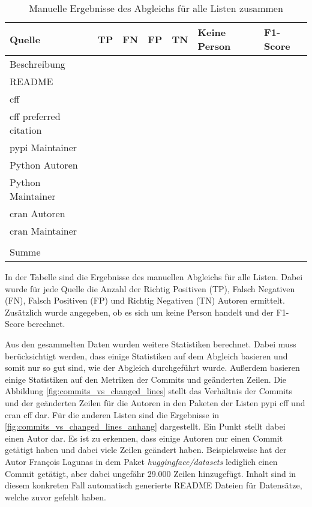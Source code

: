 \begin{table}
    \centering
    \begin{tabularx}{\textwidth}{XR{.5cm}R{.5cm}R{.5cm}R{.5cm}R{2.8cm}R{2cm}}
        \toprule
        \textbf{Quelle} & \textbf{TP} & \textbf{FN} & \textbf{FP} & \textbf{TN} & \textbf{Keine Person} & \textbf{F1-Score} \\ \midrule
        Beschreibung                 & & & & & & \\
        README                       & & & & & & \\
        \gls{cff}                    & & & & & & \\
        \gls{cff} preferred citation & & & & & & \\
        \gls{pypi} Maintainer        & & & & & & \\
        Python Autoren               & & & & & & \\
        Python Maintainer            & & & & & & \\
        \gls{cran} Autoren           & & & & & & \\
        \gls{cran} Maintainer        & & & & & & \\
                      & & & & & & \\ \midrule
        Summe                        & & & & & & \\
        \bottomrule
    \end{tabularx}
    \caption{Manuelle Ergebnisse des Abgleichs für alle Listen zusammen}
    \label{tab:matching_results_manual}
    \small
    \raggedright
    In der Tabelle sind die Ergebnisse des manuellen Abgleichs für alle Listen. Dabei wurde für jede Quelle die Anzahl der Richtig Positiven (TP), Falsch Negativen (FN), Falsch Positiven (FP) und Richtig Negativen (TN) Autoren ermittelt. Zusätzlich wurde angegeben, ob es sich um keine Person handelt und der F1-Score berechnet.
\end{table}

Aus den gesammelten Daten wurden weitere Statistiken berechnet.
Dabei muss berücksichtigt werden, dass einige Statistiken auf dem Abgleich basieren und somit nur so gut sind, wie der Abgleich durchgeführt wurde.
Außerdem basieren einige Statistiken auf den Metriken der Commits und geänderten Zeilen.
Die Abbildung \autoref{fig:commits_vs_changed_lines} stellt das Verhältnis der Commits und der geänderten Zeilen für die Autoren in den Paketen der Listen \gls{pypi} \gls{cff} und \gls{cran} \gls{cff} dar.
Für die anderen Listen sind die Ergebnisse in \autoref{fig:commits_vs_changed_lines_anhang} dargestellt.
Ein Punkt stellt dabei einen Autor dar.
Es ist zu erkennen, dass einige Autoren nur einen Commit getätigt haben und dabei viele Zeilen geändert haben.
Beispielsweise hat der Autor François Lagunas in dem Paket \emph{huggingface/datasets} lediglich einen Commit getätigt, aber dabei ungefähr 29.000 Zeilen hinzugefügt.
Inhalt sind in diesem konkreten Fall automatisch generierte README Dateien für Datensätze, welche zuvor gefehlt haben.

